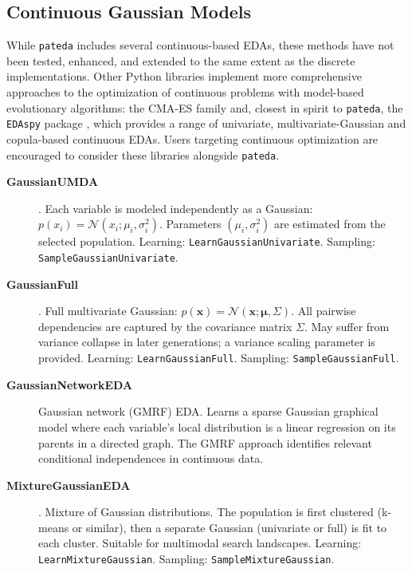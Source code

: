 \documentclass[a4paper,11pt]{article}
\begin{document}
\subsection{Continuous Gaussian Models}
\label{sec:gaussian}

While \texttt{pateda} includes several continuous-based EDAs, these methods have not been tested, enhanced, and extended to the same extent as the discrete implementations. Other Python libraries implement more comprehensive approaches to the optimization of continuous problems with model-based evolutionary algorithms: the CMA-ES family \cite{Nomura_and_Shibata:2019} and, closest in spirit to \texttt{pateda}, the \texttt{EDAspy} package \citep{Soloviev_et_al:2024}, which provides a range of univariate, multivariate-Gaussian and copula-based continuous EDAs. Users targeting continuous optimization are encouraged to consider these libraries alongside \texttt{pateda}.

\begin{description}
  \item[\textbf{GaussianUMDA}] \citep{Larranhaga_et_al:1999,Larranhaga_et_al:2000}.
    Each variable is modeled independently as a Gaussian:
    $p(x_i) = \mathcal{N}(x_i; \mu_i, \sigma_i^2)$.
    Parameters $(\mu_i, \sigma_i^2)$ are estimated from the selected population.
    Learning: \texttt{LearnGaussianUnivariate}. Sampling: \texttt{SampleGaussianUnivariate}.

  \item[\textbf{GaussianFull}] \citep{Larranhaga_et_al:2000,Bosman_and_Thierens:2000}.
    Full multivariate Gaussian: $p(\mathbf{x}) = \mathcal{N}(\mathbf{x};\boldsymbol{\mu},\Sigma)$.
    All pairwise dependencies are captured by the covariance matrix $\Sigma$.
    May suffer from variance collapse in later generations\citep{Bosman_and_Grahl:2008}; a variance scaling parameter is provided.
    Learning: \texttt{LearnGaussianFull}. Sampling: \texttt{SampleGaussianFull}.

  \item[\textbf{GaussianNetworkEDA}]
    Gaussian network (GMRF) EDA.  Learns a sparse Gaussian graphical model where each variable's local distribution is a linear regression on its parents in a directed graph.  The GMRF approach identifies relevant conditional independences in continuous data.

  \item[\textbf{MixtureGaussianEDA}] \citep{Bosman_and_Thierens:2002}.
    Mixture of Gaussian distributions.  The population is first clustered  (k-means or similar), then a separate Gaussian (univariate or full) is fit to each cluster.  Suitable for multimodal search landscapes.
    Learning: \texttt{LearnMixtureGaussian}. Sampling: \texttt{SampleMixtureGaussian}.
\end{description}
\end{document}
